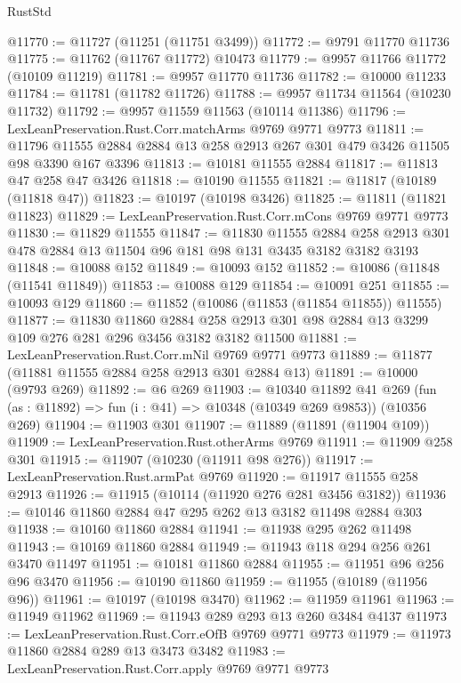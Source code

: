 \begin{lexlean}{RustStd}
\begin{coremodule}
@11770 := @11727 (@11251 (@11751 @3499))
@11772 := @9791 @11770 @11736
@11775 := @11762 (@11767 @11772) @10473
@11779 := @9957 @11766 @11772 (@10109 @11219)
@11781 := @9957 @11770 @11736
@11782 := @10000 @11233
@11784 := @11781 (@11782 @11726)
@11788 := @9957 @11734 @11564 (@10230 @11732)
@11792 := @9957 @11559 @11563 (@10114 @11386)
@11796 := LexLeanPreservation.Rust.Corr.matchArms @9769 @9771 @9773
@11811 := @11796 @11555 @2884 @2884 @13 @258 @2913 @267 @301 @479 @3426 @11505 @98 @3390 @167 @3396
@11813 := @10181 @11555 @2884
@11817 := @11813 @47 @258 @47 @3426
@11818 := @10190 @11555
@11821 := @11817 (@10189 (@11818 @47))
@11823 := @10197 (@10198 @3426)
@11825 := @11811 (@11821 @11823)
@11829 := LexLeanPreservation.Rust.Corr.mCons @9769 @9771 @9773
@11830 := @11829 @11555
@11847 := @11830
    @11555
    @2884
    @258
    @2913
    @301
    @478
    @2884
    @13
    @11504
    @96
    @181
    @98
    @131
    @3435
    @3182
    @3182
    @3193
@11848 := @10088 @152
@11849 := @10093 @152
@11852 := @10086 (@11848 (@11541 @11849))
@11853 := @10088 @129
@11854 := @10091 @251
@11855 := @10093 @129
@11860 := @11852 (@10086 (@11853 (@11854 @11855)) @11555)
@11877 := @11830
    @11860
    @2884
    @258
    @2913
    @301
    @98
    @2884
    @13
    @3299
    @109
    @276
    @281
    @296
    @3456
    @3182
    @3182
    @11500
@11881 := LexLeanPreservation.Rust.Corr.mNil @9769 @9771 @9773
@11889 := @11877 (@11881 @11555 @2884 @258 @2913 @301 @2884 @13)
@11891 := @10000 (@9793 @269)
@11892 := @6 @269
@11903 := @10340
    @11892
    @41
    @269
    (fun (as : @11892) => fun (i : @41) => @10348 (@10349 @269 @9853))
    (@10356 @269)
@11904 := @11903 @301
@11907 := @11889 (@11891 (@11904 @109))
@11909 := LexLeanPreservation.Rust.otherArms @9769
@11911 := @11909 @258 @301
@11915 := @11907 (@10230 (@11911 @98 @276))
@11917 := LexLeanPreservation.Rust.armPat @9769
@11920 := @11917 @11555 @258 @2913
@11926 := @11915 (@10114 (@11920 @276 @281 @3456 @3182))
@11936 := @10146 @11860 @2884 @47 @295 @262 @13 @3182 @11498 @2884 @303
@11938 := @10160 @11860 @2884
@11941 := @11938 @295 @262 @11498
@11943 := @10169 @11860 @2884
@11949 := @11943 @118 @294 @256 @261 @3470 @11497
@11951 := @10181 @11860 @2884
@11955 := @11951 @96 @256 @96 @3470
@11956 := @10190 @11860
@11959 := @11955 (@10189 (@11956 @96))
@11961 := @10197 (@10198 @3470)
@11962 := @11959 @11961
@11963 := @11949 @11962
@11969 := @11943 @289 @293 @13 @260 @3484 @4137
@11973 := LexLeanPreservation.Rust.Corr.eOfB @9769 @9771 @9773
@11979 := @11973 @11860 @2884 @289 @13 @3473 @3482
@11983 := LexLeanPreservation.Rust.Corr.apply @9769 @9771 @9773

\end{coremodule}
\end{lexlean}
